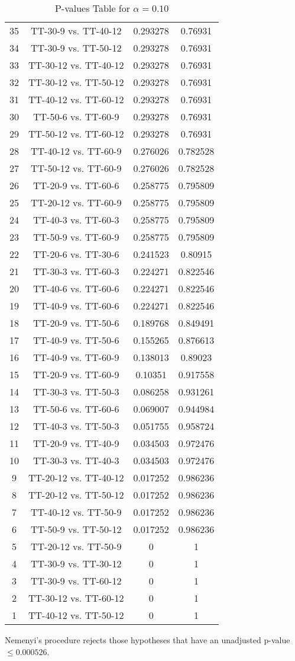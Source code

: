 \documentclass[a4paper,10pt]{article}
\begin{document}
\begin{landscape}
\begin{table}[!htp]
\begin{tabular}{cccc}
35&TT-30-9 vs. TT-40-12&0.293278&0.76931\\
34&TT-30-9 vs. TT-50-12&0.293278&0.76931\\
33&TT-30-12 vs. TT-40-12&0.293278&0.76931\\
32&TT-30-12 vs. TT-50-12&0.293278&0.76931\\
31&TT-40-12 vs. TT-60-12&0.293278&0.76931\\
30&TT-50-6 vs. TT-60-9&0.293278&0.76931\\
29&TT-50-12 vs. TT-60-12&0.293278&0.76931\\
28&TT-40-12 vs. TT-60-9&0.276026&0.782528\\
27&TT-50-12 vs. TT-60-9&0.276026&0.782528\\
26&TT-20-9 vs. TT-60-6&0.258775&0.795809\\
25&TT-20-12 vs. TT-60-9&0.258775&0.795809\\
24&TT-40-3 vs. TT-60-3&0.258775&0.795809\\
23&TT-50-9 vs. TT-60-9&0.258775&0.795809\\
22&TT-20-6 vs. TT-30-6&0.241523&0.80915\\
21&TT-30-3 vs. TT-60-3&0.224271&0.822546\\
20&TT-40-6 vs. TT-60-6&0.224271&0.822546\\
19&TT-40-9 vs. TT-60-6&0.224271&0.822546\\
18&TT-20-9 vs. TT-50-6&0.189768&0.849491\\
17&TT-40-9 vs. TT-50-6&0.155265&0.876613\\
16&TT-40-9 vs. TT-60-9&0.138013&0.89023\\
15&TT-20-9 vs. TT-60-9&0.10351&0.917558\\
14&TT-30-3 vs. TT-50-3&0.086258&0.931261\\
13&TT-50-6 vs. TT-60-6&0.069007&0.944984\\
12&TT-40-3 vs. TT-50-3&0.051755&0.958724\\
11&TT-20-9 vs. TT-40-9&0.034503&0.972476\\
10&TT-30-3 vs. TT-40-3&0.034503&0.972476\\
9&TT-20-12 vs. TT-40-12&0.017252&0.986236\\
8&TT-20-12 vs. TT-50-12&0.017252&0.986236\\
7&TT-40-12 vs. TT-50-9&0.017252&0.986236\\
6&TT-50-9 vs. TT-50-12&0.017252&0.986236\\
5&TT-20-12 vs. TT-50-9&0&1\\
4&TT-30-9 vs. TT-30-12&0&1\\
3&TT-30-9 vs. TT-60-12&0&1\\
2&TT-30-12 vs. TT-60-12&0&1\\
1&TT-40-12 vs. TT-50-12&0&1\\
\hline
\end{tabular}
\caption{P-values Table for $\alpha=0.10$}
\end{table}Nemenyi's procedure rejects those hypotheses that have an unadjusted p-value $\le0.000526$.


\end{landscape}
\end{document}
